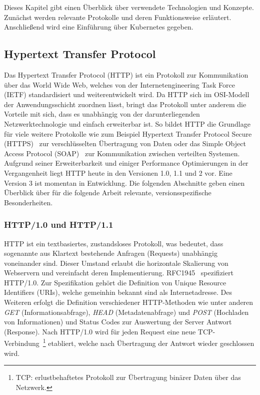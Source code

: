 Dieses Kapitel gibt einen Überblick über verwendete Technologien und Konzepte.
Zunächst werden relevante Protokolle und deren Funktionsweise erläutert.
Anschließend wird eine Einführung über Kubernetes gegeben.

\subsection{Hypertext Transfer Protocol}\label{subsec:hyper-text-transfer-protocol}

Das Hypertext Transfer Protocol (HTTP) ist ein Protokoll zur Kommunikation über das World Wide Web, welches von der Internetengineering Task Force (IETF) standardisiert und weiterentwickelt wird.
Da HTTP sich im OSI-Modell der Anwendungsschicht zuordnen lässt, bringt das Protokoll unter anderem die Vorteile mit sich, dass es unabhängig von der darunterliegenden Netzwerktechnologie und einfach erweiterbar ist.
So bildet HTTP die Grundlage für viele weitere Protokolle wie zum Beispiel Hypertext Transfer Protocol Secure (HTTPS)~\cite{rfc2818} zur verschlüsselten Übertragung von Daten oder das Simple Object Access Protocol (SOAP)~\cite{SOAP-20000508} zur Kommunikation zwischen verteilten Systemen.
Aufgrund seiner Erweiterbarkeit und einiger Performance Optimierungen in der Vergangenheit liegt HTTP heute in den Versionen 1.0, 1.1 und 2 vor.
Eine Version 3 ist momentan in Entwicklung.
Die folgenden Abschnitte geben einen Überblick über für die folgende Arbeit relevante, versionsspezifische Besonderheiten.

\subsubsection{HTTP/1.0 und HTTP/1.1}
HTTP ist ein textbasiertes, zustandsloses Protokoll, was bedeutet, dass sogenannte aus Klartext bestehende Anfragen (Requests) unabhängig voneinander sind.
Dieser Umstand erlaubt die horizontale Skalierung von Webservern und vereinfacht deren Implementierung.
RFC1945~\cite{rfc1945} spezifiziert HTTP/1.0.
Zur Spezifikation gehört die Definition von Unique Resource Identifiers (URIs), welche gemeinhin bekannt sind als Internetadresse.
Des Weiteren erfolgt die Definition verschiedener HTTP-Methoden wie unter anderen \textit{GET} (Informationsabfrage), \textit{HEAD} (Metadatenabfrage) und \textit{POST} (Hochladen von Informationen) und Status Codes zur Auswertung der Server Antwort (Response).
Nach HTTP/1.0 wird für jeden Request eine neue TCP-Verbindung~\footnote{TCP: erlustbehaftetes Protokoll zur Übertragung binärer Daten über das Netzwerk.} etabliert, welche nach Übertragung der Antwort wieder geschlossen wird.

